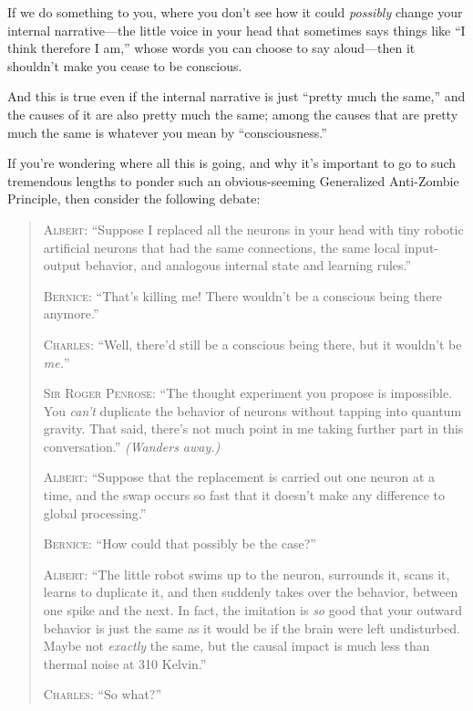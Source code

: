 {
 If we do something to you, where you don't see how
it could \textit{possibly} change your internal narrative---the little
voice in your head that sometimes says things like ``I
think therefore I am,'' whose words you can choose to
say aloud---then it shouldn't make you cease to be
conscious.}

{
 And this is true even if the internal narrative is just
``pretty much the same,'' and the
causes of it are also pretty much the same; among the causes that are
pretty much the same is whatever you mean by
``consciousness.''}

{
 If you're wondering where all this is going, and
why it's important to go to such tremendous lengths to
ponder such an obvious-seeming Generalized Anti-Zombie Principle, then
consider the following debate:}

\begin{quotation}
{
 \textsc{Albert}: ``Suppose I replaced all the neurons in
your head with tiny robotic artificial neurons that had the same
connections, the same local input-output behavior, and analogous
internal state and learning rules.''}

{
 \textsc{Bernice}: ``That's killing me!
There wouldn't be a conscious being there
anymore.''}

{
 \textsc{Charles}: ``Well, there'd still be
a conscious being there, but it wouldn't be
\textit{me.}''}

{
 \textsc{Sir Roger Penrose}: ``The thought experiment you
propose is impossible. You \textit{can't} duplicate the
behavior of neurons without tapping into quantum gravity. That said,
there's not much point in me taking further part in
this conversation.'' \textit{(Wanders away.)}}

{
 \textsc{Albert}: ``Suppose that the replacement is carried
out one neuron at a time, and the swap occurs so fast that it
doesn't make any difference to global
processing.''}

{
 \textsc{Bernice}: ``How could that possibly be the
case?''}

{
 \textsc{Albert}: ``The little robot swims up to the
neuron, surrounds it, scans it, learns to duplicate it, and then
suddenly takes over the behavior, between one spike and the next. In
fact, the imitation is \textit{so} good that your outward behavior is
just the same as it would be if the brain were left undisturbed. Maybe
not \textit{exactly} the same, but the causal impact is much less than
thermal noise at 310 Kelvin.''}

{
 \textsc{Charles}: ``So what?''}


\end{quotation}
